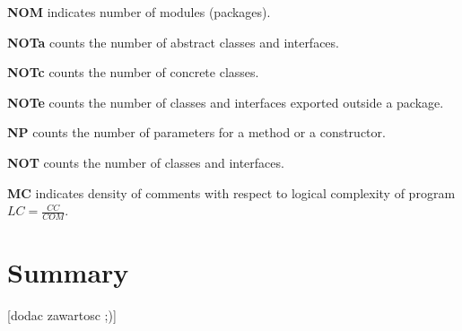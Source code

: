 \textbf{\ac{NOM}} indicates number of modules (packages).

\textbf{\ac{NOTa}} counts the number of abstract classes and interfaces.

\textbf{\ac{NOTc}} counts the number of concrete classes.	

\textbf{\ac{NOTe}} counts the number of classes and interfaces exported outside a package.

\textbf{\ac{NP}} counts the number of parameters for a method or a constructor.

\textbf{\ac{NOT}} counts the number of classes and interfaces.

\textbf{\ac{MC}} indicates density of comments with respect to logical complexity of program $LC=\frac { CC }{ COM } $.

\section{Summary}
[dodac zawartosc ;)]
